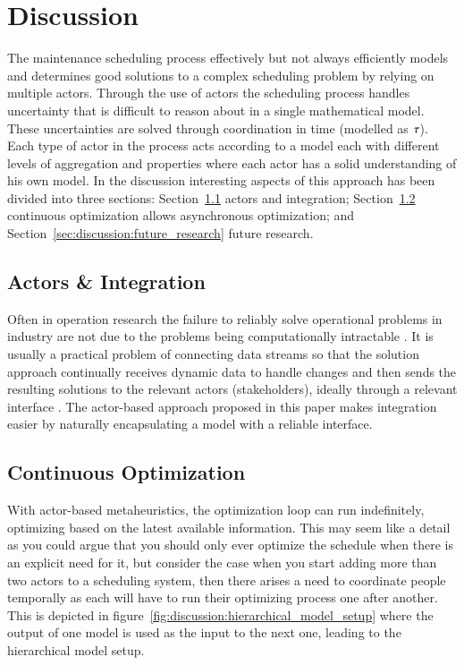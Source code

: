 \section{Discussion}\label{sec:4-discussion}
The maintenance scheduling process effectively but not always efficiently models and 
determines good solutions to a complex scheduling
problem by relying on multiple actors. Through the use of actors the scheduling
process handles uncertainty that is difficult to reason about in a single
mathematical model. These  uncertainties are solved through coordination in
time (modelled as $\tau$). Each type of actor in the process acts
according to a model each with different levels of aggregation and properties
where each actor has a solid understanding of his own model. In the discussion
interesting aspects of this approach has been divided into three 
sections: Section~\ref{sec:discussion:actors_and_integration}
actors and integration; Section~\ref{sec:discussion:continuous_optimization}
continuous optimization allows asynchronous optimization;  and
Section~\ref{sec:discussion:future_research} future research.

\subsection{Actors \& Integration}\label{sec:discussion:actors_and_integration}
Often in operation research the failure to reliably solve operational
problems in industry are not due to the problems being computationally
intractable \citep{gendreauHandbookMetaheuristics2019}. It is usually a practical
problem of connecting data streams so that the solution approach continually
receives dynamic data to handle changes and then sends the resulting
solutions to the relevant actors (stakeholders), ideally through a relevant interface
\citep{meignanReviewTaxonomyInteractive2015}. The actor-based approach proposed
in this paper makes integration easier by naturally encapsulating a model with a
reliable interface.

\subsection{Continuous Optimization}\label{sec:discussion:continuous_optimization}
With actor-based metaheuristics, the optimization loop can run indefinitely,
optimizing based on the latest available information. This may seem like a
detail as you could argue that you should only ever optimize the schedule
when there is an explicit need for it, but consider the case when you start
adding more than two actors to a scheduling system, then there arises a need
to coordinate people temporally as each will have to run their optimizing
process one after another. This is depicted in figure~\ref{fig:discussion:hierarchical_model_setup}
where the output of one model is used as the input to the next one, leading
to the hierarchical model setup.

